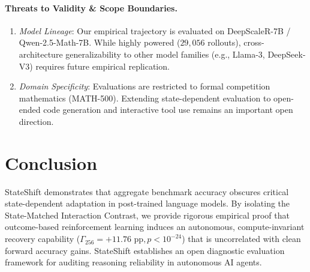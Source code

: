 \documentclass[11pt]{article}
\begin{document}
\paragraph{Threats to Validity \& Scope Boundaries.}
\begin{enumerate}
    \item \emph{Model Lineage}: Our empirical trajectory is evaluated on DeepScaleR-7B / Qwen-2.5-Math-7B. While highly powered ($29,056$ rollouts), cross-architecture generalizability to other model families (e.g., Llama-3, DeepSeek-V3) requires future empirical replication.
    \item \emph{Domain Specificity}: Evaluations are restricted to formal competition mathematics (MATH-500). Extending state-dependent evaluation to open-ended code generation and interactive tool use remains an important open direction.
\end{enumerate}

\section{Conclusion}
StateShift demonstrates that aggregate benchmark accuracy obscures critical state-dependent adaptation in post-trained language models. By isolating the State-Matched Interaction Contrast, we provide rigorous empirical proof that outcome-based reinforcement learning induces an autonomous, compute-invariant recovery capability ($\Gamma_{256} = +11.76\text{ pp}, p < 10^{-24}$) that is uncorrelated with clean forward accuracy gains. StateShift establishes an open diagnostic evaluation framework for auditing reasoning reliability in autonomous AI agents.



\end{document}

